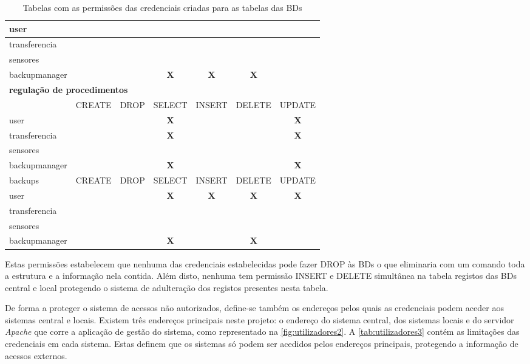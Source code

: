 \documentclass[11pt,twoside,a4paper]{report}
\begin{document}
\begin{table}
\begin{tabular}{|l|c|c|c|c|c|c|}
		user & & & & & & \\ \hline
		transferencia & & & & & & \\ \hline
		sensores & & & & & & \\ \hline
		backupmanager & & & \textbf{X} & \textbf{X} & \textbf{X} & \\ \hline
		\multicolumn{7}{l}{\textbf{regulação de procedimentos}} \\ \hline
		\makecell{atualizar} & CREATE & DROP & SELECT & INSERT & DELETE & UPDATE \\ \hline
		user & & & \textbf{X} & & & \textbf{X} \\ \hline
		transferencia & & & \textbf{X} & & & \textbf{X} \\ \hline
		sensores & & & & & & \\ \hline
		backupmanager & & & \textbf{X} & & & \textbf{X} \\ \hline
		backups & CREATE & DROP & SELECT & INSERT & DELETE & UPDATE \\ \hline
		user & & & \textbf{X} & \textbf{X} & \textbf{X} & \textbf{X} \\ \hline
		transferencia & & & & & & \\ \hline
		sensores & & & & & & \\ \hline
		backupmanager & & & \textbf{X} & & \textbf{X} & \\ \hline
	\end{tabular}
	\caption[Tabelas com as permissões criadas para as bases de dados]{Tabelas com as permissões das credenciais criadas para as tabelas das BDs}
	\label{tab:utilizadores1}
\end{table}
Estas permissões estabelecem que nenhuma das credenciais estabelecidas pode fazer DROP às BDs o que eliminaria com um comando toda a estrutura e a informação nela contida. Além disto, nenhuma tem permissão INSERT e DELETE simultânea na tabela registos das BDs central e local protegendo o sistema de adulteração dos registos presentes nesta tabela.\par 
De forma a proteger o sistema de acessos não autorizados, define-se também os endereços pelos quais as credenciais podem aceder aos sistemas central e locais. Existem três endereços principais neste projeto: o endereço do sistema central, dos sistemas locais e do servidor \textit{Apache} que corre a aplicação de gestão do sistema, como representado na \autoref{fig:utilizadores2}. A \autoref{tab:utilizadores3} contém as limitações das credenciais em cada sistema. Estas definem que os sistemas só podem ser acedidos pelos endereços principais, protegendo a informação de acessos externos.
\end{document}
